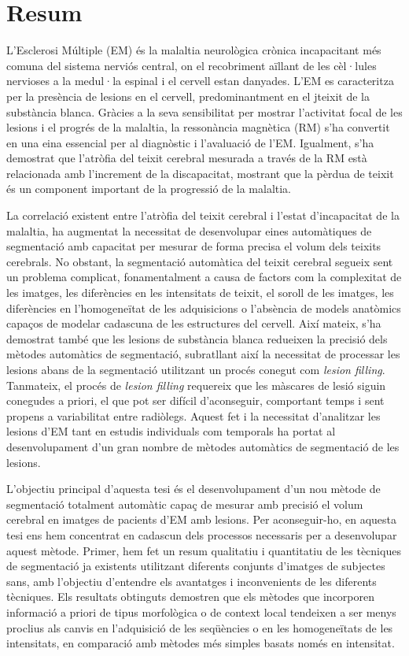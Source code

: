 \chapter*{Resum}


L'Esclerosi Múltiple (EM)  és la malaltia neurològica crònica incapacitant més comuna del sistema nerviós central, on el recobriment aïllant de les cèl·lules nervioses a la medul·la espinal i el cervell estan danyades. L'EM es caracteritza per la presència de lesions en el cervell, predominantment en el jteixit de la substància blanca. Gràcies a la seva sensibilitat per mostrar l'activitat focal de les lesions i el progrés de la malaltia, la ressonància magnètica (RM) s'ha convertit en una eina essencial per al diagnòstic i l'avaluació de l'EM. Igualment, s'ha demostrat que l'atròfia del teixit cerebral mesurada a través de la RM està relacionada amb l'increment de la discapacitat, mostrant que la pèrdua de teixit és un component important de la progressió de la malaltia.

La correlació existent entre l'atròfia del teixit cerebral i l'estat d'incapacitat de la malaltia, ha augmentat la necessitat de desenvolupar
eines automàtiques de segmentació amb capacitat per mesurar de forma precisa el volum dels teixits cerebrals. No obstant, la segmentació automàtica del teixit cerebral segueix sent un problema complicat, fonamentalment a causa de factors com la complexitat de les imatges, les diferències en les intensitats de teixit, el soroll de les imatges, les diferències en l'homogeneïtat de les adquisicions o l'absència de models anatòmics capaços de modelar cadascuna de les estructures del cervell. Així mateix, s'ha demostrat també que les lesions de substància blanca redueixen la precisió dels mètodes automàtics de segmentació, subratllant així la necessitat de processar les lesions abans de la segmentació utilitzant un procés conegut com \textit{lesion filling}. Tanmateix, el procés de \textit{lesion filling} requereix que les màscares de lesió siguin conegudes a priori, el que pot ser difícil d'aconseguir, comportant temps i sent propens a variabilitat entre radiòlegs. Aquest fet i la necessitat d'analitzar les lesions d'EM tant en estudis individuals com temporals ha portat al desenvolupament d'un gran nombre de mètodes automàtics de segmentació de les lesions.

L'objectiu principal d'aquesta tesi és el desenvolupament d'un nou mètode de segmentació totalment automàtic capaç de mesurar amb precisió el volum cerebral en imatges de pacients d'EM amb lesions. Per aconseguir-ho, en aquesta tesi ens hem concentrat en cadascun dels processos necessaris per a desenvolupar aquest mètode. Primer, hem fet un resum qualitatiu i quantitatiu de les tècniques de segmentació ja existents utilitzant diferents conjunts d'imatges de subjectes sans, amb l'objectiu d'entendre els avantatges i inconvenients de les diferents tècniques. Els resultats obtinguts demostren que els mètodes que incorporen informació a priori de tipus morfològica o de context local tendeixen a ser menys proclius als canvis en l'adquisició de les seqüències o en les homogeneïtats de les intensitats, en comparació amb mètodes més simples basats només en intensitat.

